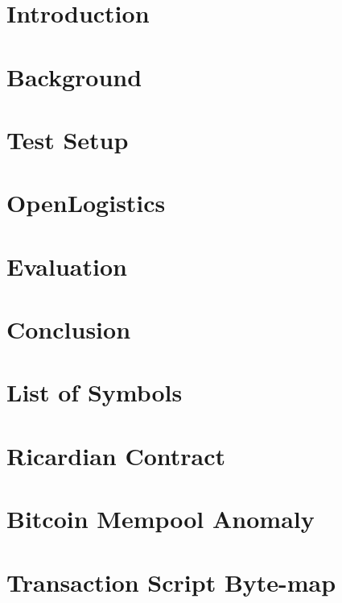 \documentclass[Nomencl]{DylanMaster}
\begin{document}
\mytitlepage

\newpage

\tableofcontents

\newpage
\section{Introduction}


\newpage
\section{Background}


\newpage
\section{Test Setup}


\newpage
\section{OpenLogistics}


\newpage
\section{Evaluation}


\newpage
\section{Conclusion}


\newpage
\appendix
\section{List of Symbols}


\newpage
\section{Ricardian Contract}


\newpage
\section{Bitcoin Mempool Anomaly}


\newpage
\section{Transaction Script Byte-map}


\newpage


\end{document}
